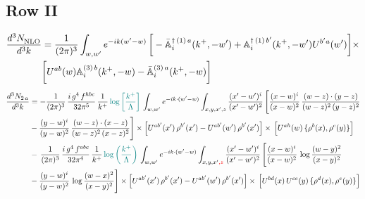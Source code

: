\documentclass[9pt]{article}
\def\mf#1{\mathbb{#1}}
\numberwithin{equation}{section}
\begin{document}
\subsection{Row II}
\begin{align}
    \frac{d^{3}N_{\rm NLO}^{\rm}}{d^{3}k} &  = \frac{1}{(2\pi)^{3}}  \int_{w, w^\prime} e^{-ik(w^\prime-w)}\,\bigg[-\bar{\mf{A}}^{\dagger\,(1)\,a}_{i}(k^{+},-w^{\prime})+\mf{A}^{\dagger\, (1)\, b^{\prime}}_{i}(k^{+},-w^{\prime})U^{b^{\prime}a}(w^{\prime})\bigg]\times \notag \\ & \bigg[U^{ab}(w)\mf{A}^{(3)\, b}_{i}(k^{+},- w)-\Bar{\mf{A}}^{(3)\, a}_{i}(k^{+}, - w)\bigg]\nonumber
\end{align}
\begin{align}
    \frac{d^{3}N_{2\,a}}{d^{3}k} & = -\frac{1}{(2\pi)^{3}}\,\frac{i\,g^{4}\,f^{hbc}}{32\pi^{5}}\,\frac{1}{k^{+}}\,{\color{teal}\log{\left[\frac{k^{+}}{\Lambda}\right]}}\,
\int_{w,w'} e^{-ik\cdot(w'-w)}\int_{x,y,x',z}\frac{(x'-w')^{i}}{(x'-w')^{2}}\,\Bigg[\frac{(x-w)^{i}}{(x-w)^{2}}\, \frac{(w-z)\cdot (y-z)}{(w-z)^{2}\,(y-z)^{2}}\notag \\ & - \frac{(y-w)^{i}}{(y-w)^{2}}\, \frac{(w-z)\cdot (x-z)}{(w-z)^{2}\,(x-z)^{2}}\Bigg]\times\Big[U^{ab'}(x')\,\rho^{b'}(x')-U^{ab'}(w')\,\rho^{b'}(x')\Big]\times\, \Big[U^{ah}(w)\,\{\rho^{b}(x),\rho^{c}(y)\}\Big]\notag \\ &  -\,\frac{1}{(2\pi)^{3}}\,\frac{i\,g^{4}\,f^{abc}}{32\pi^{4}}\,\frac{1}{k^{+}}\,{\color{teal}\log\left(\frac{k^{+}}{\Lambda}\right)}\,
\int_{w,w'} e^{-ik\cdot(w'-w)}\int_{x,y,x'{\color{red},z}}\frac{(x'-w')^{i}}{(x'-w')^{2}}\,\Bigg[\frac{(x-w)^{i}}{(x-w)^{2}}\,\log\frac{(w-y)^{2}}{(x-y)^{2}}\notag \\ & -\frac{(y-w)^{i}}{(y-w)^{2}}\,\log\frac{(w-x)^{2}}{(x-y)^{2}}\Bigg]\times \Big[U^{ab'}(x')\,\rho^{b'}(x')-U^{ab'}(w')\,\rho^{b'}(x')\Big]\times\, \Big[U^{bd}(x)\,U^{ce}(y)\,\{\rho^{d}(x),\rho^{e}(y)\}\Big]
\end{align}
\end{document}
